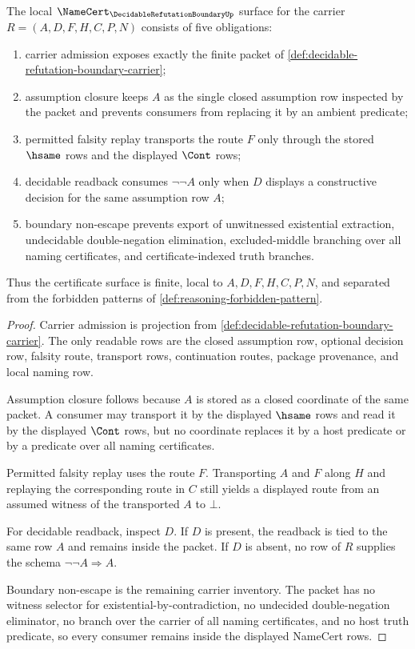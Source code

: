 \begin{theorem}
\label{thm:decidable-refutation-boundary-namecert-obligations}
The local $\NameCert_{\DecidableRefutationBoundaryUp}$ surface for the carrier $R=(A,D,F,H,C,P,N)$ consists of five obligations:
\begin{enumerate}
\item carrier admission exposes exactly the finite packet of \autoref{def:decidable-refutation-boundary-carrier};
\item assumption closure keeps $A$ as the single closed assumption row inspected by the packet and prevents consumers from replacing it by an ambient predicate;
\item permitted falsity replay transports the route $F$ only through the stored $\hsame$ rows and the displayed $\Cont$ rows;
\item decidable readback consumes $\neg\neg A$ only when $D$ displays a constructive decision for the same assumption row $A$;
\item boundary non-escape prevents export of unwitnessed existential extraction, undecidable double-negation elimination, excluded-middle branching over all naming certificates, and certificate-indexed truth branches.
\end{enumerate}
Thus the certificate surface is finite, local to $A,D,F,H,C,P,N$, and separated from the forbidden patterns of \autoref{def:reasoning-forbidden-pattern}.
\end{theorem}
\begin{proof}
Carrier admission is projection from \autoref{def:decidable-refutation-boundary-carrier}. The only readable rows are the closed assumption row, optional decision row, falsity route, transport rows, continuation routes, package provenance, and local naming row.

Assumption closure follows because $A$ is stored as a closed coordinate of the same packet. A consumer may transport it by the displayed $\hsame$ rows and read it by the displayed $\Cont$ rows, but no coordinate replaces it by a host predicate or by a predicate over all naming certificates.

Permitted falsity replay uses the route $F$. Transporting $A$ and $F$ along $H$ and replaying the corresponding route in $C$ still yields a displayed route from an assumed witness of the transported $A$ to $\bot$.

For decidable readback, inspect $D$. If $D$ is present, the readback is tied to the same row $A$ and remains inside the packet. If $D$ is absent, no row of $R$ supplies the schema $\neg\neg A\Rightarrow A$.

Boundary non-escape is the remaining carrier inventory. The packet has no witness selector for existential-by-contradiction, no undecided double-negation eliminator, no branch over the carrier of all naming certificates, and no host truth predicate, so every consumer remains inside the displayed NameCert rows.
\end{proof}

